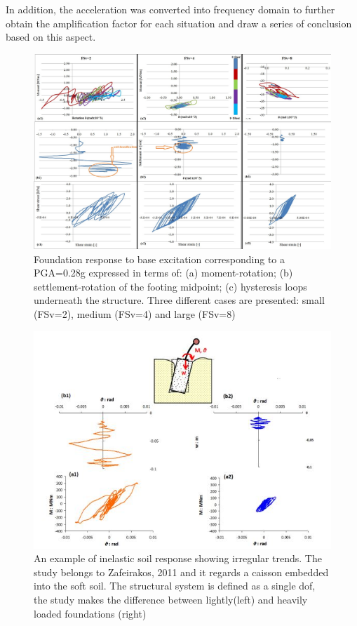 In addition, the acceleration was converted into frequency domain to further obtain the amplification factor for each situation and draw a series of conclusion based on this aspect.

 \begin{figure}[!h]
 	\centering
 	\includegraphics[width=0.9\linewidth]{"fs2,4,8"}
 	\caption{Foundation response to base excitation corresponding to a PGA=0.28g expressed in terms of: (a) moment-rotation; (b) settlement-rotation of the footing midpoint; (c) hysteresis loops underneath the structure. Three different cases are presented: small (FSv=2), medium (FSv=4) and large (FSv=8)}
 	\label{eq2}
 \end{figure}

 \begin{figure}[!h]
 	\centering
 	\includegraphics[width=0.7\linewidth]{"irregular"}
 	\caption{An example of inelastic soil response showing irregular trends. The study belongs to Zafeirakos, 2011 \cite{zafeirakos2011role} and it regards a caisson embedded into the soft soil. The structural system is defined as a single dof, the study makes the difference between lightly(left) and heavily loaded foundations (right)}
 	\label{eq5}
 \end{figure}

